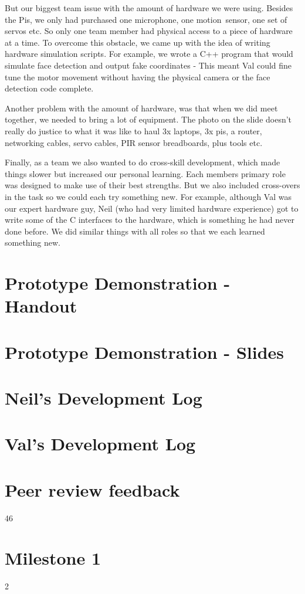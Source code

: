 \documentclass[11pt,a4paper,titlepage]{report}
\begin{document}
\begin{appendices}
But our biggest team issue with the amount of hardware we were using. Besides the Pis, we only had purchased one microphone, one motion sensor, one set of servos etc. So only one team member had physical access to a piece of hardware at a time. To overcome this obstacle, we came up with the idea of writing hardware simulation scripts. For example, we wrote a C++ program that would simulate face detection and output fake coordinates - This meant Val could fine tune the motor movement without having the physical camera or the face detection code complete.

Another problem with the amount of hardware, was that when we did meet together, we needed to bring a lot of equipment. The photo on the slide doesn’t really do justice to what it was like to haul 3x laptops, 3x pis, a router, networking cables, servo cables, PIR sensor breadboards, plus tools etc.

Finally, as a team we also wanted to do cross-skill development, which made things slower but increased our personal learning. Each members primary role was designed to make use of their best strengths. But we also included cross-overs in the task so we could each try something new. For example, although Val was our expert hardware guy, Neil (who had very limited hardware experience) got to write some of the C interfaces to the hardware, which is something he had never done before. We did similar things with all roles so that we each learned something new.

\chapter{Prototype Demonstration - Handout}




\chapter{Prototype Demonstration - Slides}



\chapter{Neil's Development Log}


\chapter{Val's Development Log}



\chapter{Peer review feedback}
\newpage
\addtocounter {page} {46}

\chapter{Milestone 1}
\newpage
\addtocounter {page} {2}


\end{appendices}

\nocite{*}
\printbibliography[heading=bibintoc]
\end{document}
